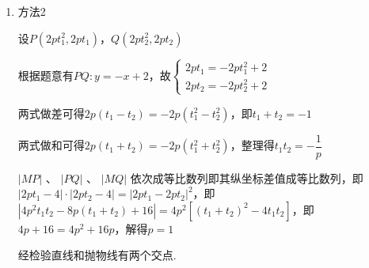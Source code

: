 \begin{enumerate}
\begin{jieda}
\begin{enumerate}
            代入抛物线方程有$\left(\dfrac{\sqrt{2}t}{2} + 4\right)^2 = 2p\left(-\dfrac{\sqrt{2}t}{2} - 2\right)$，整理得$2{t}^{2} + 4\sqrt{2}\left( {4 + p}\right) t + {16}\left( {4 + p}\right)  = 0$

            根据韦达定理有$\left\{\begin{array}{l}
                 t_1+t_2 = -2\sqrt{2}(4+p)  \\
                 t_1t_2 = 8(4+p)
            \end{array}\right.$

            $|MP| = -t_1, |MQ| = -t_2, |PQ| = |t_2-t_1|$，故$t_1t_2 = (t_2-t_1)^2$，即$t_1t_2 = (t_1+t_2)^2-4t_1t_2$，即$40(4+p) = 8(4+p)^2$，解得$p = 1$
            
            经检验直线和抛物线有两个交点.
            
            \item 方法2

            设$P(2pt_1^2, 2pt_1)$，$Q(2pt_2^2, 2pt_2)$
    
            根据题意有$PQ: y = -x+2$，故$\left\{\begin{array}{l}
                 2pt_1 = -2pt_1^2+2  \\
                 2pt_2 = -2pt_2^2+2
            \end{array}\right.$
    
            两式做差可得$2p(t_1-t_2) = -2p(t_1^2-t_2^2)$，即$t_1+t_2=-1$
            
            两式做和可得$2p(t_1+t_2) = -2p(t_1^2+t_2^2)$，整理得$t_1t_2=-\dfrac{1}{p}$
    
            $\left| {MP}\right| \text{ 、 }\left| {PQ}\right| \text{ 、 }\left| {MQ}\right|$ 依次成等比数列即其纵坐标差值成等比数列，即$|2pt_1-4|\cdot|2pt_2-4| = |2pt_1-2pt_2|^2$，即$|4p^2t_1t_2-8p(t_1+t_2)+16| = 4p^2[(t_1+t_2)^2-4t_1t_2]$，即$4p+16 = 4p^2+16p$，解得$p = 1$
            
            经检验直线和抛物线有两个交点.
        \end{enumerate}
    \end{jieda}
    

\end{enumerate}
